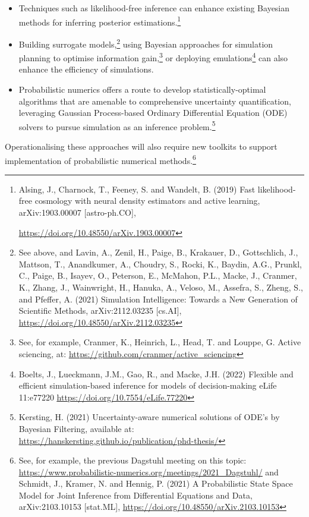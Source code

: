 \begin{itemize}
\item
  Techniques such as likelihood-free inference can enhance existing
  Bayesian methods for inferring posterior estimations.\footnote{Alsing,
    J., Charnock, T., Feeney, S. and Wandelt, B. (2019) Fast
    likelihood-free cosmology with neural density estimators and active
    learning, arXiv:1903.00007 {[}astro-ph.CO{]},

    \uline{\url{https://doi.org/10.48550/arXiv.1903.00007}}}
\item
  Building surrogate models,\footnote{See above, and Lavin, A., Zenil,
    H., Paige, B., Krakauer, D., Gottschlich, J., Mattson, T.,
    Anandkumer, A., Choudry, S., Rocki, K., Baydin, A.G., Prunkl, C.,
    Paige, B., Isayev, O., Peterson, E., McMahon, P.L., Macke, J.,
    Cranmer, K., Zhang, J., Wainwright, H., Hanuka, A., Veloso, M.,
    Assefra, S., Zheng, S., and Pfeffer, A. (2021) Simulation
    Intelligence: Towards a New Generation of Scientific Methods,
    arXiv:2112.03235 {[}cs.AI{]},
    \href{https://doi.org/10.48550/arXiv.2112.03235}{\hfill\break
    \uline{https://doi.org/10.48550/arXiv.2112.03235}}} using Bayesian
  approaches for simulation planning to optimise information
  gain,\footnote{See, for example, Cranmer, K., Heinrich, L., Head, T.
    and Louppe, G. Active sciencing, at:
    \href{https://github.com/cranmer/active_sciencing}{\uline{https://github.com/cranmer/active\_sciencing}}}
  or deploying emulations\footnote{Boelts, J., Lueckmann, J.M., Gao, R.,
    and Macke, J.H. (2022) Flexible and efficient simulation-based
    inference for models of decision-making eLife 11:e77220
    \href{https://doi.org/10.7554/eLife.77220}{\uline{https://doi.org/10.7554/eLife.77220}}}
  can also enhance the efficiency of simulations.
\item
  Probabilistic numerics offers a route to develop statistically-optimal
  algorithms that are amenable to comprehensive uncertainty
  quantification, leveraging Gaussian Process-based Ordinary
  Differential Equation (ODE) solvers to pursue simulation as an
  inference problem.\footnote{Kersting, H. (2021) Uncertainty-aware
    numerical solutions of ODE's by Bayesian Filtering, available at:
    \href{https://hanskersting.github.io/publication/phd-thesis/}{\uline{https://hanskersting.github.io/publication/phd-thesis/}}}
\end{itemize}

Operationalising these approaches will also require new toolkits to
support implementation of probabilistic numerical methods.\footnote{See,
  for example, the previous Dagstuhl meeting on this topic:
  \href{https://www.probabilistic-numerics.org/meetings/2021_Dagstuhl/}{\uline{https://www.probabilistic-numerics.org/meetings/2021\_Dagstuhl/}}
  and Schmidt, J., Kramer, N. and Hennig, P. (2021) A Probabilistic
  State Space Model for Joint Inference from Differential Equations and
  Data, arXiv:2103.10153 {[}stat.ML{]},
  \href{https://doi.org/10.48550/arXiv.2103.10153}{\uline{https://doi.org/10.48550/arXiv.2103.10153}}}

